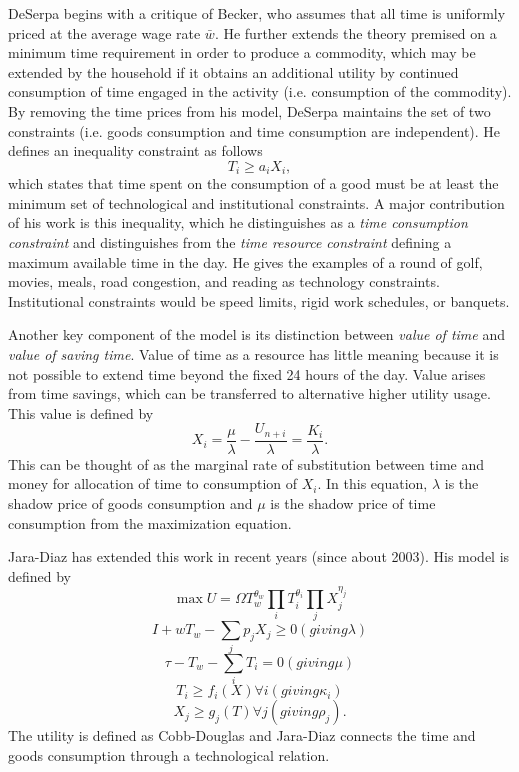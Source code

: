 DeSerpa begins with a critique of Becker, who assumes that all time is uniformly priced at the average wage rate $\bar{w}$. He further extends the theory premised on a minimum time requirement in order to produce a commodity, which may be extended by the household if it obtains an additional utility by continued consumption of time engaged in the activity (i.e. consumption of the commodity). By removing the time prices from his model, DeSerpa maintains the set of two constraints (i.e. goods consumption and time consumption are independent). He defines an inequality constraint as follows
\begin{equation}
	T_i \geq a_i X_i,
\end{equation}
which states that time spent on the consumption of a good must be at least the minimum set of technological and institutional constraints. A major contribution of his work is this inequality, which he distinguishes as a \emph{time consumption constraint} and distinguishes from the \emph{time resource constraint} defining a maximum available time in the day. He gives the examples of a round of golf, movies, meals, road congestion, and reading as technology constraints. Institutional constraints would be speed limits, rigid work schedules, or banquets.

Another key component of the model is its distinction between \emph{value of time} and \emph{value of saving time}. Value of time as a resource has little meaning because it is not possible to extend time beyond the fixed 24 hours of the day. Value arises from time savings, which can be transferred to alternative higher utility usage. This value is defined by
\begin{equation}
	X_i = \frac{\mu}{\lambda} - \frac{U_{n+i}}{\lambda} = \frac{K_i}{\lambda}.
\end{equation}
This can be thought of as the marginal rate of substitution between time and money for allocation of time to consumption of $X_i$. In this equation, $\lambda$ is the shadow price of goods consumption and $\mu$ is the shadow price of time consumption from the maximization equation.

Jara-Diaz has extended this work in recent years (since about 2003). His model is defined by
\begin{equation}
	\max U = \Omega T_w^{\theta_w} \prod_i T_i^{\theta_i} \prod_j X_j^{\eta_j}
\end{equation}
\begin{equation}
	I + wT_w - \sum_j p_j X_j \geq 0 (giving \lambda)
\end{equation}
\begin{equation}
	\tau - T_w - \sum_i T_i = 0 (giving \mu)
\end{equation}
\begin{equation}
	T_i \geq f_i(X) \forall i (giving \kappa_i)
\end{equation}
\begin{equation}
	X_j \geq g_j(T) \forall j (giving \rho_j) .
\end{equation}
The utility is defined as Cobb-Douglas and Jara-Diaz connects the time and goods consumption through a technological relation.


